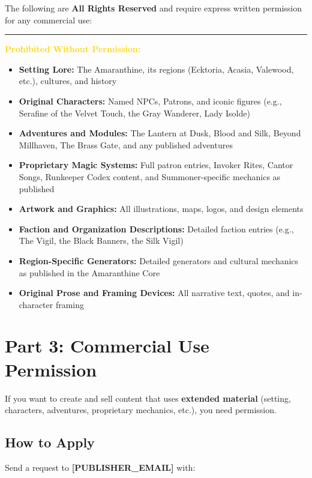 \documentclass[11pt]{article}
\newenvironment{policybox}[2]{
  \begin{framed}
  \setlength{\fboxsep}{12pt}
  \color{textlight}
  \noindent
  \textcolor{#2}{\rule{4pt}{\dimexpr\height+4pt\relax}}%
  \hspace{8pt}%
  \textbf{\textcolor{gold}{#1}}\par
  \vspace{4pt}
}{
  \end{framed}
}
\begin{document}
The following are \textbf{All Rights Reserved} and require express written permission for any commercial use:

\begin{policybox}{Prohibited Without Permission:}{borderclosed}
  \begin{itemize}[leftmargin=*, itemsep=2pt]
    \item \textbf{Setting Lore:} The Amaranthine, its regions (Ecktoria, Acasia, Valewood, etc.), cultures, and history
    \item \textbf{Original Characters:} Named NPCs, Patrons, and iconic figures (e.g., Serafine of the Velvet Touch, the Gray Wanderer, Lady Isolde)
    \item \textbf{Adventures and Modules:} The Lantern at Dusk, Blood and Silk, Beyond Millhaven, The Brass Gate, and any published adventures
    \item \textbf{Proprietary Magic Systems:} Full patron entries, Invoker Rites, Cantor Songs, Runkeeper Codex content, and Summoner-specific mechanics as published
    \item \textbf{Artwork and Graphics:} All illustrations, maps, logos, and design elements
    \item \textbf{Faction and Organization Descriptions:} Detailed faction entries (e.g., The Vigil, the Black Banners, the Silk Vigil)
    \item \textbf{Region-Specific Generators:} Detailed generators and cultural mechanics as published in the Amaranthine Core
    \item \textbf{Original Prose and Framing Devices:} All narrative text, quotes, and in-character framing
  \end{itemize}
\end{policybox}

\section*{Part 3: Commercial Use Permission}

If you want to create and sell content that uses \textbf{extended material} (setting, characters, adventures, proprietary mechanics, etc.), you need permission.

\subsection*{How to Apply}

Send a request to \textbf{[PUBLISHER\_EMAIL]} with:
\end{document}
